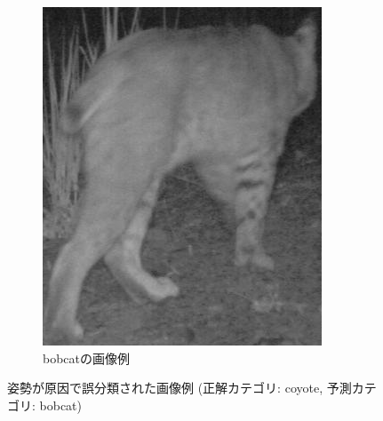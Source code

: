 \documentclass[a4paper,11pt,nomag]{jsreport}
\begin{document}
\begin{figure}[tbp]
\begin{subfigure}[b]{0.45\linewidth}
    \includegraphics[height=0.9\linewidth, keepaspectratio]{image/bobcat.png}
    \caption{bobcatの画像例}
    \label{fig:bobcat}
  \end{subfigure}
  \caption{姿勢が原因で誤分類された画像例 (正解カテゴリ: coyote, 予測カテゴリ: bobcat)}
  \label{fig:animalback}
\end{figure}



\end{document}
